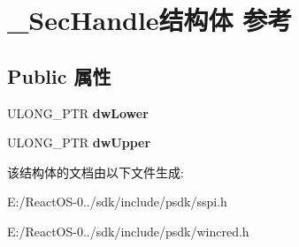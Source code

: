 \hypertarget{struct___sec_handle}{}\section{\+\_\+\+Sec\+Handle结构体 参考}
\label{struct___sec_handle}
\subsection*{Public 属性}
\begin{DoxyCompactItemize}
\item 
\mbox{\label{struct___sec_handle_a55858a2abd8c3d10659f7769f7b66f8a}} 
U\+L\+O\+N\+G\+\_\+\+P\+TR {\bfseries dw\+Lower}
\item 
\mbox{\label{struct___sec_handle_a90f64c7eba2690ba38d8da017c8cf70a}} 
U\+L\+O\+N\+G\+\_\+\+P\+TR {\bfseries dw\+Upper}
\end{DoxyCompactItemize}


该结构体的文档由以下文件生成\+:\begin{DoxyCompactItemize}
\item 
E\+:/\+React\+O\+S-\/0../sdk/include/psdk/sspi.\+h\item 
E\+:/\+React\+O\+S-\/0../sdk/include/psdk/wincred.\+h\end{DoxyCompactItemize}
